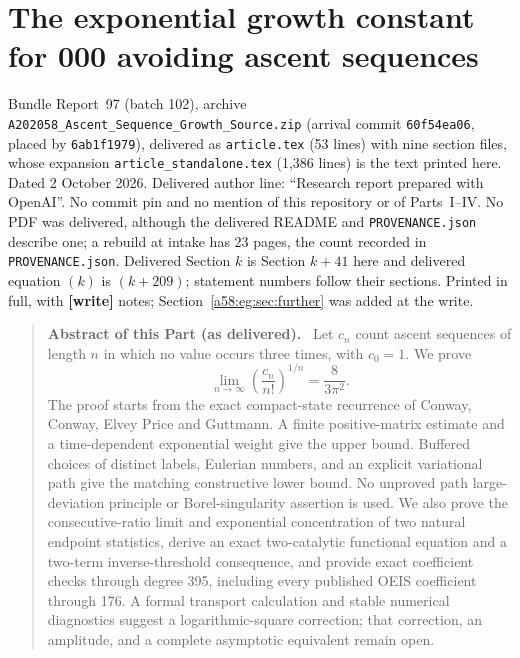 \documentclass[11pt,letterpaper]{article}
\newcommand{\file}[1]{\nolinkurl{#1}}
\theoremstyle{remark}
\newenvironment{partabstract}{\begin{quote}\small\noindent\textbf{Abstract of this Part (as delivered).}\ }{\end{quote}}
\newcommand{\partsource}[1]{\par\noindent\begin{minipage}{\textwidth}\small #1\end{minipage}\par\medskip}
\begin{document}
\part{The exponential growth constant for 000 avoiding ascent sequences}\label{a58:part:eg}
\partsource{Bundle Report~97 (batch 102), archive \file{A202058_Ascent_Sequence_Growth_Source.zip} (arrival commit \texttt{60f54ea06}, placed by \texttt{6ab1f1979}), delivered as \file{article.tex} (53 lines) with nine section files, whose expansion \file{article_standalone.tex} (1,386 lines) is the text printed here. Dated 2 October 2026. Delivered author line: ``Research report prepared with OpenAI''. No commit pin and no mention of this repository or of Parts~I--IV. No PDF was delivered, although the delivered README and \file{PROVENANCE.json} describe one; a rebuild at intake has 23 pages, the count recorded in \file{PROVENANCE.json}. Delivered Section $k$ is Section $k+41$ here and delivered equation $(k)$ is $(k+209)$; statement numbers follow their sections. Printed in full, with \textbf{[write]} notes; Section~\ref{a58:eg:sec:further} was added at the write.}
\begin{partabstract}
Let $c_n$ count ascent sequences of length $n$ in which no value occurs three times, with $c_0=1$. We prove
\[
 \lim_{n\to\infty}\left(\frac{c_n}{n!}\right)^{1/n}
 =\frac{8}{3\pi^2}.
\]
The proof starts from the exact compact-state recurrence of Conway, Conway, Elvey Price and Guttmann. A finite positive-matrix estimate and a time-dependent exponential weight give the upper bound. Buffered choices of distinct labels, Eulerian numbers, and an explicit variational path give the matching constructive lower bound. No unproved path large-deviation principle or Borel-singularity assertion is used. We also prove the consecutive-ratio limit and exponential concentration of two natural endpoint statistics, derive an exact two-catalytic functional equation and a two-term inverse-threshold consequence, and provide exact coefficient checks through degree 395, including every published OEIS coefficient through 176. A formal transport calculation and stable numerical diagnostics suggest a logarithmic-square correction; that correction, an amplitude, and a complete asymptotic equivalent remain open.
\end{partabstract}
\end{document}
